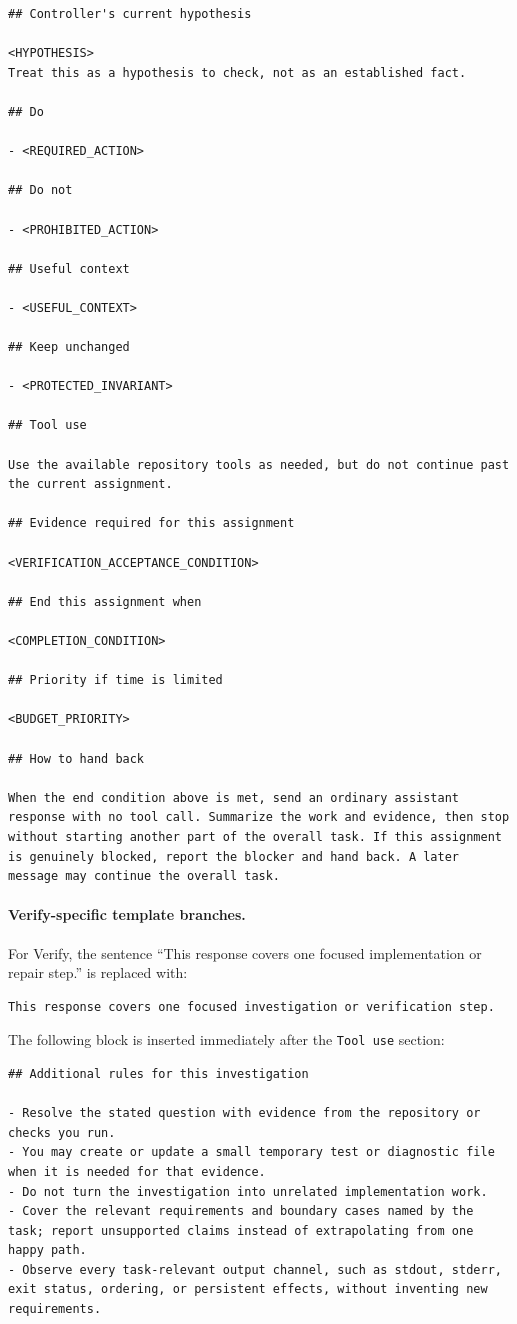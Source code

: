 \begin{lstlisting}[style=looparenaprompt]
## Controller's current hypothesis

<HYPOTHESIS>
Treat this as a hypothesis to check, not as an established fact.

## Do

- <REQUIRED_ACTION>

## Do not

- <PROHIBITED_ACTION>

## Useful context

- <USEFUL_CONTEXT>

## Keep unchanged

- <PROTECTED_INVARIANT>

## Tool use

Use the available repository tools as needed, but do not continue past the current assignment.

## Evidence required for this assignment

<VERIFICATION_ACCEPTANCE_CONDITION>

## End this assignment when

<COMPLETION_CONDITION>

## Priority if time is limited

<BUDGET_PRIORITY>

## How to hand back

When the end condition above is met, send an ordinary assistant response with no tool call. Summarize the work and evidence, then stop without starting another part of the overall task. If this assignment is genuinely blocked, report the blocker and hand back. A later message may continue the overall task.
\end{lstlisting}

\paragraph{Verify-specific template branches.}
For Verify, the sentence ``This response covers one focused implementation or repair step.'' is replaced with:
\begin{lstlisting}[style=looparenaprompt]
This response covers one focused investigation or verification step.
\end{lstlisting}
The following block is inserted immediately after the \texttt{Tool use} section:
\begin{lstlisting}[style=looparenaprompt]
## Additional rules for this investigation

- Resolve the stated question with evidence from the repository or checks you run.
- You may create or update a small temporary test or diagnostic file when it is needed for that evidence.
- Do not turn the investigation into unrelated implementation work.
- Cover the relevant requirements and boundary cases named by the task; report unsupported claims instead of extrapolating from one happy path.
- Observe every task-relevant output channel, such as stdout, stderr, exit status, ordering, or persistent effects, without inventing new requirements.
\end{lstlisting}

